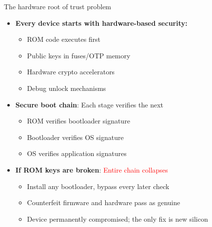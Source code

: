 \ifdefined\PRESENTATION\else\PassOptionsToClass{handout}{beamer}\fi\documentclass[aspectratio=169, lualatex]{beamer}
\begin{document}
\begin{frame}{The hardware root of trust problem}
	\begin{itemize}
		\item \textbf{Every device starts with hardware-based security:}
		      \begin{itemize}
			      \item ROM code executes first
			      \item Public keys in fuses/OTP memory
			      \item Hardware crypto accelerators
			      \item Debug unlock mechanisms
		      \end{itemize}
		\item \textbf{Secure boot chain}: Each stage verifies the next
		      \begin{itemize}
			      \item ROM verifies bootloader signature
			      \item Bootloader verifies OS signature
			      \item OS verifies application signatures
		      \end{itemize}
		\item \textbf{If ROM keys are broken}: \textcolor{red}{Entire chain collapses}
		      \begin{itemize}
			      \item Install any bootloader, bypass every later check
			      \item Counterfeit firmware and hardware pass as genuine
			      \item Device permanently compromised; the only fix is new silicon
		      \end{itemize}
	\end{itemize}
\end{frame}
\end{document}
